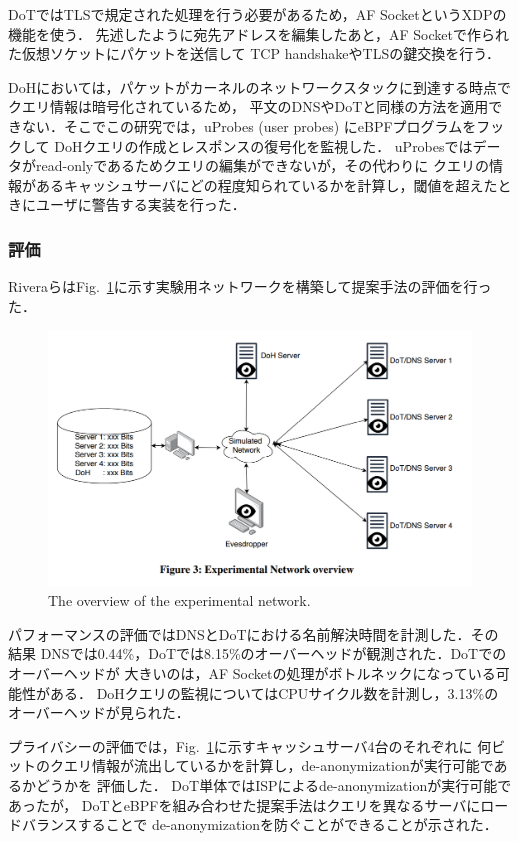 \documentclass[platex,a4j,10pt,twoside,twocolumn,dvipdfmx]{jsarticle}
\newcommand{\Fref}[1]{Fig.~\ref{#1}}
\begin{document}
DoTではTLSで規定された処理を行う必要があるため，AF SocketというXDPの機能を使う．
先述したように宛先アドレスを編集したあと，AF Socketで作られた仮想ソケットにパケットを送信して
TCP handshakeやTLSの鍵交換を行う．

DoHにおいては，パケットがカーネルのネットワークスタックに到達する時点でクエリ情報は暗号化されているため，
平文のDNSやDoTと同様の方法を適用できない．そこでこの研究では，uProbes (user probes) にeBPFプログラムをフックして
DoHクエリの作成とレスポンスの復号化を監視した．
uProbesではデータがread-onlyであるためクエリの編集ができないが，その代わりに
クエリの情報があるキャッシュサーバにどの程度知られているかを計算し，閾値を超えたときにユーザに警告する実装を行った．

\subsubsection{評価}
Riveraらは\Fref{img:dns-net}に示す実験用ネットワークを構築して提案手法の評価を行った．
\begin{figure}[tp]
  \begin{center}
    \includegraphics[width=\columnwidth]{./img/dns-eval-net.png}
  \end{center}
  \caption{The overview of the experimental network.}
  \label{img:dns-net}
\end{figure}

パフォーマンスの評価ではDNSとDoTにおける名前解決時間を計測した．その結果
DNSでは0.44\%，DoTでは8.15\%のオーバーヘッドが観測された．DoTでのオーバーヘッドが
大きいのは，AF Socketの処理がボトルネックになっている可能性がある．
DoHクエリの監視についてはCPUサイクル数を計測し，3.13\%のオーバーヘッドが見られた．

プライバシーの評価では，\Fref{img:dns-net}に示すキャッシュサーバ4台のそれぞれに
何ビットのクエリ情報が流出しているかを計算し，de-anonymizationが実行可能であるかどうかを
評価した．
DoT単体ではISPによるde-anonymizationが実行可能であったが，
DoTとeBPFを組み合わせた提案手法はクエリを異なるサーバにロードバランスすることで
de-anonymizationを防ぐことができることが示された．
\end{document}
